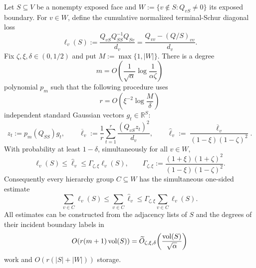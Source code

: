\begin{theorem}
\label{thm:chebyshev-diagonal-loss-checkpoint}
Let $S\subseteq V$ be a nonempty exposed face and
$W:=\{v\notin S:Q_{vS}\neq0\}$ its exposed boundary.  For $v\in W$, define
the cumulative normalized terminal-Schur diagonal loss
\begin{equation}
 \ell_v(S)
 :=\frac{Q_{vS}Q_{SS}^{-1}Q_{Sv}}{d_v}
 =\frac{Q_{vv}-(Q/S)_{vv}}{d_v}.
 \label{eq:checkpoint-diagonal-loss}
\end{equation}
Fix $\zeta,\xi,\delta\in(0,1/2)$ and put
$M:=\max\{1,|W|\}$.  There is a degree
\begin{equation}
 m=O\!\left(
  \frac1{\sqrt\alpha}
  \log\frac1{\alpha\zeta}
 \right)
 \label{eq:inverse-square-root-degree}
\end{equation}
polynomial $p_m$ such that the following procedure uses
\begin{equation}
 r=O\!\left(\xi^{-2}\log\frac{M}{\delta}\right)
 \label{eq:checkpoint-sketch-count}
\end{equation}
independent standard Gaussian vectors $g_t\in\mathbb R^S$:
\begin{equation}
 z_t:=p_m(Q_{SS})g_t,
 \qquad
 \overline\ell_v
 :=\frac1r\sum_{t=1}^r
 \frac{(Q_{vS}z_t)^2}{d_v},
 \qquad
 \widehat\ell_v
 :=\frac{\overline\ell_v}
 {(1-\xi)(1-\zeta)^2}.
 \label{eq:checkpoint-estimator}
\end{equation}
With probability at least $1-\delta$, simultaneously for all $v\in W$,
\begin{equation}
 \ell_v(S)\leq\widehat\ell_v
 \leq
 \Gamma_{\zeta,\xi}\ell_v(S),
 \qquad
 \Gamma_{\zeta,\xi}
 :=\frac{(1+\xi)(1+\zeta)^2}
 {(1-\xi)(1-\zeta)^2}.
 \label{eq:checkpoint-one-sided-guarantee}
\end{equation}
Consequently every hierarchy group $C\subseteq W$ has the simultaneous
one-sided estimate
\begin{equation}
 \sum_{v\in C}\ell_v(S)
 \leq\sum_{v\in C}\widehat\ell_v
 \leq\Gamma_{\zeta,\xi}
       \sum_{v\in C}\ell_v(S).
 \label{eq:checkpoint-group-guarantee}
\end{equation}
All estimates can be constructed from the adjacency lists of $S$ and the
degrees of their incident boundary labels in
\begin{equation}
 O\!\left(r(m+1)\operatorname{vol}(S)\right)
 =\widetilde O_{\zeta,\xi,\delta}
   \!\left(\frac{\operatorname{vol}(S)}{\sqrt\alpha}\right)
 \label{eq:checkpoint-construction-work}
\end{equation}
work and $O(r(|S|+|W|))$ storage.
\end{theorem}

